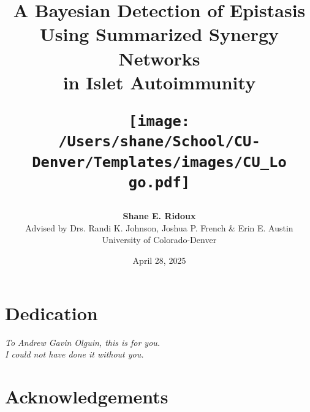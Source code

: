 \documentclass{article}\usepackage[]{graphicx}\usepackage[]{color}
\begin{document}
% 
\title{\bf A Bayesian Detection of Epistasis \\ Using Summarized Synergy Networks \\ in Islet Autoimmunity
\vspace{2.5cm}\\
\begin{figure}[h!]
\centering \texttt{[image: /Users/shane/School/CU-Denver/Templates/images/CU\_Logo.pdf]}
\end{figure}
}
\author{{\bf \huge Shane E. Ridoux} \\
Advised by Drs. Randi K. Johnson, Joshua P. French \& Erin E. Austin\\
University of Colorado-Denver}

\date{April 28, 2025}



 \linespread{2}

 \maketitle
 \thispagestyle{empty}


\newpage
\tableofcontents
\thispagestyle{empty}
\newpage


\doublespacing
\section*{Dedication}  %
\vspace{8cm}  %

\begin{center}
    \textit{To Andrew Gavin Olguin, this is for you.} \\
    \textit{I could not have done it without you.}
\end{center}

\vspace{1cm}  %
\newpage

\section*{Acknowledgements}  %
\end{document}
